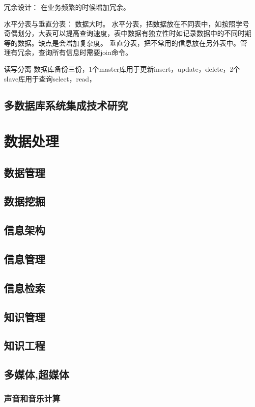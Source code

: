 \documentclass[UTF8]{../computerUniverse}
\begin{document}
    
    冗余设计：
    在业务频繁的时候增加冗余。
    
    水平分表与垂直分表：
    数据大时。
    水平分表，把数据放在不同表中，如按照学号奇偶划分，大表可以提高查询速度，表中数据有独立性时如记录数据中的不同时期等的数据。缺点是会增加复杂度。
    垂直分表，把不常用的信息放在另外表中。管理有冗余，查询所有信息时需要join命令。
    
    读写分离
    数据库备份三份，1个master库用于更新insert，update，delete，2个slave库用于查询select，read，
    
    




    \section{多数据库系统集成技术研究}

\chapter{数据处理}
\section{数据管理}
\section{数据挖掘}
\section{信息架构}
\section{信息管理}
\section{信息检索}
\section{知识管理}
\section{知识工程}

\section{多媒体,超媒体}
\subsection{声音和音乐计算}
\end{document}
